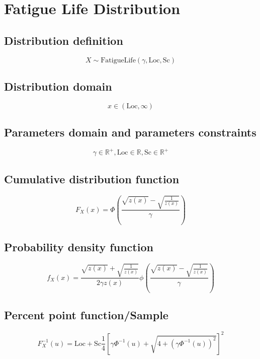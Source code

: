 \documentclass{article}
\begin{document}
\newpage
\section{Fatigue Life Distribution}
\subsection{Distribution definition}
\begin{equation*} X\sim\mathrm{FatigueLife}\left(\gamma,\text{Loc},\text{Sc}\right) \end{equation*}
\subsection{Distribution domain}
\begin{equation*} x\in\left(\text{Loc},\infty\right) \end{equation*}
\subsection{Parameters domain and parameters constraints}
\begin{equation*} \gamma\in\mathbb{R}^{+}, \text{Loc}\in\mathbb{R}, \text{Sc}\in\mathbb{R}^{+} \end{equation*}
\subsection{Cumulative distribution function}
\begin{equation*} F_{X}\left(x\right)=\Phi\left(\frac{\sqrt{z(x)}-\sqrt{\frac{1}{z(x)}}}{\gamma}\right) \end{equation*}
\subsection{Probability density function}
\begin{equation*} f_{X}\left(x\right)=\frac{\sqrt{z(x)}+\sqrt{\frac{1}{z(x)}}}{2\gamma z(x)}\phi\left(\frac{\sqrt{z(x)}-\sqrt{\frac{1}{z(x)}}}{\gamma}\right) \end{equation*}
\subsection{Percent point function/Sample}
\begin{equation*} F^{-1}_{X}\left(u\right)=\text{Loc}+\text{Sc}\frac{1}{4}\left[\gamma\Phi^{-1}(u)+\sqrt{4+\left(\gamma\Phi^{-1}(u)\right)^2}\right]^2 \end{equation*}
\end{document}
